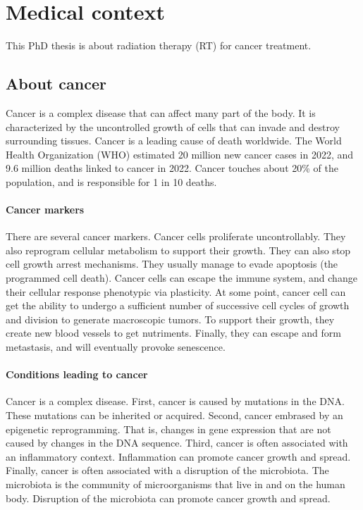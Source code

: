 \section{Medical context}

This PhD thesis is about radiation therapy (RT) for cancer treatment.

\subsection{About cancer}

Cancer is a complex disease that can affect many part of the body.
It is characterized by the uncontrolled growth of cells that can invade and destroy surrounding tissues.
Cancer is a leading cause of death worldwide.
The World Health Organization (WHO) estimated 20 million new cancer cases in 2022, and 9.6 million deaths linked to cancer in 2022\cite{who_cancer2022}.
Cancer touches about 20\% of the population, and is responsible for 1 in 10 deaths.

\paragraph{Cancer markers}
There are several cancer markers.
Cancer cells proliferate uncontrollably.
They also reprogram cellular metabolism to support their growth\cite{Chammas2013}.
They can also stop cell growth arrest mechanisms.
They usually manage to evade apoptosis (the programmed cell death).
Cancer cells can escape the immune system, and change their cellular response phenotypic via plasticity.
At some point, cancer cell can get the ability to undergo a sufficient number of successive cell cycles of growth and division to generate macroscopic tumors.
To support their growth, they create new blood vessels to get nutriments.
Finally, they can escape and form metastasis, and will eventually provoke senescence.

\paragraph{Conditions leading to cancer}
Cancer is a complex disease.
First, cancer is caused by mutations in the DNA.
These mutations can be inherited or acquired.
Second, cancer embrased by an epigenetic reprogramming.
That is, changes in gene expression that are not caused by changes in the DNA sequence.
Third, cancer is often associated with an inflammatory context.
Inflammation can promote cancer growth and spread.
Finally, cancer is often associated with a disruption of the microbiota.
The microbiota is the community of microorganisms that live in and on the human body.
Disruption of the microbiota can promote cancer growth and spread.

